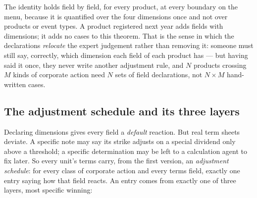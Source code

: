 The identity holds field by field, for every product, at every boundary on the
menu, because it is quantified over the four dimensions once and not over products
or event types. A product registered next year adds fields with dimensions; it
adds no cases to this theorem. That is the sense in which the declarations
\emph{relocate} the expert judgement rather than removing it: someone must still
say, correctly, which dimension each field of each product has --- but having said
it once, they never write another adjustment rule, and $N$ products crossing $M$
kinds of corporate action need $N$ sets of field declarations, not $N \times M$
hand-written cases.

\subsection{The adjustment schedule and its three layers}

Declaring dimensions gives every field a \emph{default} reaction. But real term
sheets deviate. A specific note may say its strike adjusts on a special dividend
only above a threshold; a specific determination may be left to a calculation
agent to fix later. So every unit's terms carry, from the first version, an
\emph{adjustment schedule}: for every class of corporate action and every terms
field, exactly one entry saying how that field reacts. An entry comes from exactly
one of three layers, most specific winning:

